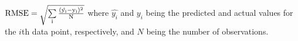 $\rm{RMSE}=\sqrt{\sum\limits_{i}\frac{(\hat{y_i}-y_i)^2}{N}}$
where $\hat{y_i}$ and $y_i$ being the predicted and actual values for the $i$th data point, respectively, and $N$ being the number of observations.